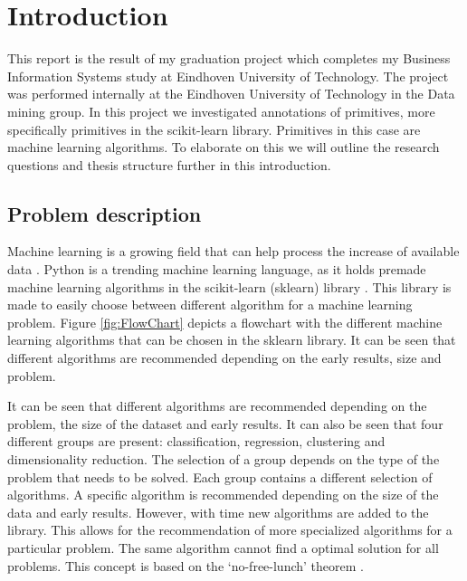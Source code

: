 \documentclass[a4paper,10pt]{article}
\begin{document}
\newpage
\tableofcontents
\newpage


\section{Introduction} \label{Chapter1}
This report is the result of my graduation project which completes my Business Information Systems study at Eindhoven University of Technology.
The project was performed internally at the Eindhoven University of Technology in the Data mining group.
In this project we investigated annotations of primitives, more specifically primitives in the scikit-learn library.
Primitives in this case are machine learning algorithms.%
To elaborate on this we will outline the research questions and thesis structure further in this introduction.
 

\subsection{Problem description}\label{Intr-Prob}
Machine learning is a growing field that can help process the increase of available data \cite{Big-data,ML-trends}. Python is a trending machine learning language, as it holds premade machine learning algorithms in the scikit-learn (sklearn) library \cite{python-pop}. This library is made to easily choose between different algorithm for a machine learning problem. Figure \ref{fig:FlowChart} depicts a flowchart with the different machine learning algorithms that can be chosen in the sklearn library. It can be seen that different algorithms are recommended depending on the early results, size and problem.
 
It can be seen that different algorithms are recommended depending on the problem, the size of the dataset and early results. 
 It can also be seen that four different groups are present: classification, regression, clustering and dimensionality reduction. The selection of a group depends on the type of the problem that needs to be solved. Each group contains a different selection of algorithms. A specific algorithm is recommended depending on the size of the data and early results.
 However, with time new algorithms are added to the library. This allows for the recommendation of more specialized algorithms for a particular problem. The same algorithm cannot find a optimal solution for all problems. This concept is based on the `no-free-lunch' theorem \cite{No-Free-Lunch}.  

 
\end{document}
